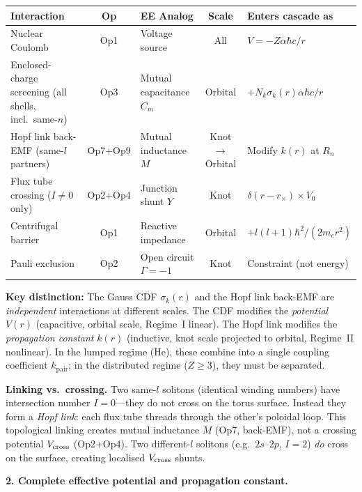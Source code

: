 \begin{center}
\small
\renewcommand{\arraystretch}{1.25}
\begin{tabular}{p{2.8cm} c p{2.2cm} c p{2.5cm}}
\toprule
\textbf{Interaction} &
\textbf{Op} &
\textbf{EE Analog} &
\textbf{Scale} &
\textbf{Enters cascade as} \\
\midrule
Nuclear Coulomb &
Op1 &
Voltage source &
All &
$V = -Z\alpha\hbar c/r$ \\
%
Enclosed-charge screening
(all shells, incl.\ same-$n$) &
Op3 &
Mutual capacitance $C_m$ &
Orbital &
$+N_k\sigma_k(r)\alpha\hbar c/r$ \\
%
Hopf link back-EMF
(same-$l$ partners) &
Op7{+}Op9 &
Mutual inductance $M$ &
Knot$\to$Orbital &
Modify $k(r)$ at $R_n$ \\
%
Flux tube crossing
($I \neq 0$ only) &
Op2{+}Op4 &
Junction shunt $Y$ &
Knot &
$\delta(r{-}r_{\times})\times V_0$ \\
%
Centrifugal barrier &
Op1 &
Reactive impedance &
Orbital &
$+l(l{+}1)\hbar^2/(2m_e r^2)$ \\
%
Pauli exclusion &
Op2 &
Open circuit $\Gamma{=}{-}1$ &
Knot &
Constraint (not energy) \\
\bottomrule
\end{tabular}
\end{center}

\noindent\textbf{Key distinction:} The Gauss CDF
$\sigma_k(r)$ and the Hopf link back-EMF are
\emph{independent} interactions at different scales.
The CDF modifies the \emph{potential} $V(r)$
(capacitive, orbital scale, Regime~I linear).
The Hopf link modifies the \emph{propagation
constant} $k(r)$ (inductive, knot scale projected
to orbital, Regime~II nonlinear).  In the lumped
regime (He), these combine into a single coupling
coefficient $k_{\text{pair}}$; in the distributed
regime ($Z \geq 3$), they must be separated.

\noindent\textbf{Linking vs.\ crossing.}
Two same-$l$ solitons (identical winding numbers)
have intersection number $I = 0$---they do not
cross on the torus surface.  Instead they form
a \emph{Hopf link}: each flux tube threads
through the other's poloidal loop.  This
topological linking creates mutual inductance
$M$ (Op7, back-EMF), not a crossing potential
$V_{\rm cross}$ (Op2+Op4).  Two different-$l$
solitons (e.g.\ $2s$--$2p$, $I = 2$)
\emph{do} cross on the surface, creating
localised $V_{\rm cross}$ shunts.

\noindent\textbf{2. Complete effective potential
and propagation constant.}

